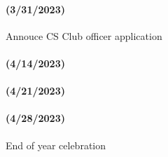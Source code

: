 \documentclass[
  letterpaper,
  DIV=11,
  numbers=noendperiod]{scrartcl}
\let\oldparagraph\paragraph
\renewcommand{\paragraph}[1]{\oldparagraph{#1}\mbox{}}
\begin{document}
\hypertarget{section-3}{%
\paragraph{(3/31/2023)}\label{section-3}}

Annouce CS Club officer application

\hypertarget{section-4}{%
\paragraph{(4/14/2023)}\label{section-4}}

\hypertarget{section-5}{%
\paragraph{(4/21/2023)}\label{section-5}}

\hypertarget{section-6}{%
\paragraph{(4/28/2023)}\label{section-6}}

End of year celebration
\end{document}
